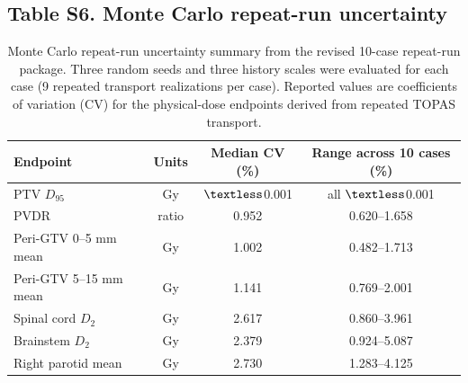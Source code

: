 \documentclass[10pt,a4paper]{article}
\begin{document}
\subsection{Table S6. Monte Carlo repeat-run uncertainty}
\begin{table}[H]
\centering
\caption{Monte Carlo repeat-run uncertainty summary from the revised 10-case repeat-run package. Three random seeds and three history scales were evaluated for each case (9 repeated transport realizations per case). Reported values are coefficients of variation (CV) for the physical-dose endpoints derived from repeated TOPAS transport.}
\label{tab:s6_mc_repeat_run_uncertainty}
\footnotesize
\begin{tabular}{lccc}
\toprule
Endpoint & Units & Median CV (\%) & Range across 10 cases (\%) \\
\midrule
PTV $D_{95}$ & Gy & $\textless$0.001 & all $\textless$0.001 \\
PVDR & ratio & 0.952 & 0.620--1.658 \\
Peri-GTV 0--5 mm mean & Gy & 1.002 & 0.482--1.713 \\
Peri-GTV 5--15 mm mean & Gy & 1.141 & 0.769--2.001 \\
Spinal cord $D_2$ & Gy & 2.617 & 0.860--3.961 \\
Brainstem $D_2$ & Gy & 2.379 & 0.924--5.087 \\
Right parotid mean & Gy & 2.730 & 1.283--4.125 \\
\bottomrule
\end{tabular}
\end{table}
\end{document}
